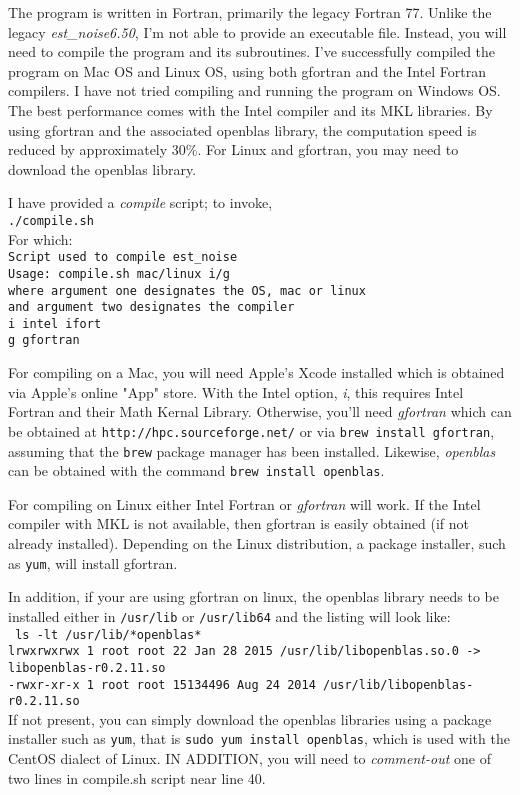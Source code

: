\documentclass[12pt]{amsart}
\begin{document}
The program is written in Fortran, primarily the legacy Fortran 77. Unlike the legacy \textit{est\_noise6.50}, I'm not
able to provide an executable file. Instead, you will need to compile the program and its subroutines. I've successfully
compiled the program on Mac OS and Linux OS, using both gfortran and the Intel Fortran compilers. 
I have not tried compiling and running the program on Windows OS. The best performance
comes with the Intel compiler and its MKL libraries.  By using gfortran and the associated openblas library, the computation speed is reduced by approximately 30\%.  For Linux and gfortran, you may need to download the openblas library.


I have provided a \textit{compile} script; to invoke,
\\
\texttt{./compile.sh}
\\
For which:
\\
\texttt{Script used to compile est\_noise \\
Usage:  compile.sh mac/linux i/g  \\
  where argument one designates the OS, mac or linux  \\
    and argument two designates the compiler \\
    i   intel ifort  \\
    g   gfortran
}

For compiling on a Mac, you will need Apple's Xcode installed which is obtained via Apple's online "App" store.
With the Intel option, \textit{i},
this requires Intel Fortran and their Math Kernal Library.  Otherwise, you'll need \textit{gfortran} which can
be obtained at \texttt{http://hpc.sourceforge.net/} or via \texttt{brew install gfortran}, assuming that the \texttt{brew} package
manager has been installed. Likewise, \textit{openblas} can be obtained with the command  \texttt{brew install openblas}.

For compiling on Linux either Intel Fortran or \textit{gfortran} will work.  If the Intel compiler with MKL
is not available, then gfortran is easily obtained (if not already installed).  Depending on the Linux
distribution, a package installer, such as \texttt{yum}, will install gfortran.

In addition, if your are using gfortran on linux, the openblas library needs to be installed either in  \texttt{/usr/lib} or \texttt{/usr/lib64} and the listing will look like:
\\
\tiny{
\texttt{
ls -lt /usr/lib/*openblas*
\\
lrwxrwxrwx 1 root root       22 Jan 28  2015 /usr/lib/libopenblas.so.0 -> libopenblas-r0.2.11.so
\\
-rwxr-xr-x 1 root root 15134496 Aug 24  2014 /usr/lib/libopenblas-r0.2.11.so
}
}
\normalsize{ }
\\
If not present, you can simply download the openblas libraries using a package installer such as \texttt{yum}, that
is \texttt{sudo yum install openblas}, which is used with the CentOS dialect of Linux. IN ADDITION, you will need to
\textit{comment-out} one of two lines in compile.sh script near line 40.
\end{document}
